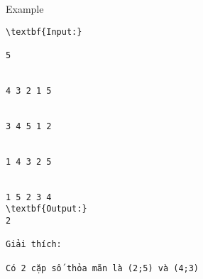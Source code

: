 Example
\begin{verbatim}
\textbf{Input:}

5


4 3 2 1 5


3 4 5 1 2


1 4 3 2 5


1 5 2 3 4
\textbf{Output:}
2

Giải thích: 

Có 2 cặp số thỏa mãn là (2;5) và (4;3)\end{verbatim}